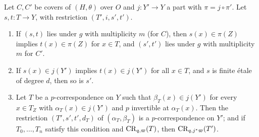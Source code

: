\begin{lemma}\label{lem:pf:steps2:restrict}
Let $C,C'$ be covers of $(H,\theta)$ over $O$ and $j\colon Y'\to Y$ a part with $\pi=j\circ\pi'$. Let
$s,t\colon T\to Y$, with restriction $(T',i,s',t')$.
\begin{enumerate}[label=\textup{(\alph*)},nosep]
\item If $(s,t)$ lies under $g$ with multiplicity $m$ (for $C$), then $s(x)\in\pi(Z)$ implies
  $t(x)\in\pi(Z)$ for $x\in T$, and $(s',t')$ lies under $g$ with multiplicity $m$ for $C'$.
\item If $s(x)\in j(Y')$ implies $t(x)\in j(Y')$ for all $x\in T$, and $s$ is finite \'etale of
  degree $d$, then so is $s'$.
\item Let $T$ be a $p$-correspondence on $Y$ such that $\beta_T(x)\in j(Y')$ for every $x\in T_Z$
  with $\alpha_T(x)\in j(Y')$ and $p$ invertible at $\alpha_T(x)$. Then the restriction
  $(T',s',t',d_T)$ of $(\alpha_T,\beta_T)$ is a $p$-correspondence on $Y'$; and if $T_0,\dots,T_n$
  satisfy this condition and $\mathrm{CR}_{q,\varpi}(T)$, then $\mathrm{CR}_{q,j^\ast\varpi}(T')$.
\end{enumerate}
\end{lemma}

